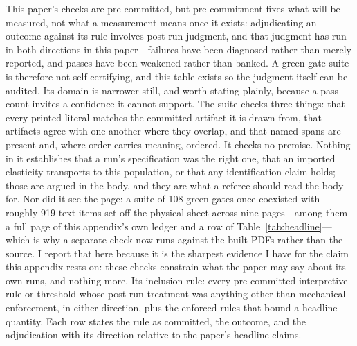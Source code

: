 \documentclass[12pt]{article}
\begin{document}
This paper's checks are pre-committed, but pre-commitment fixes what will be measured, not what a measurement means once it exists: adjudicating an outcome against its rule involves post-run judgment, and that judgment has run in both directions in this paper---failures have been diagnosed rather than merely reported, and passes have been weakened rather than banked. A green gate suite is therefore not self-certifying, and this table exists so the judgment itself can be audited. Its domain is narrower still, and worth stating plainly, because a pass count invites a confidence it cannot support. The suite checks three things: that every printed literal matches the committed artifact it is drawn from, that artifacts agree with one another where they overlap, and that named spans are present and, where order carries meaning, ordered. It checks no premise. Nothing in it establishes that a run's specification was the right one, that an imported elasticity transports to this population, or that any identification claim holds; those are argued in the body, and they are what a referee should read the body for. Nor did it see the page: a suite of 108 green gates once coexisted with roughly 919 text items set off the physical sheet across nine pages---among them a full page of this appendix's own ledger and a row of Table~\ref{tab:headline}---which is why a separate check now runs against the built PDFs rather than the source. I report that here because it is the sharpest evidence I have for the claim this appendix rests on: these checks constrain what the paper may say about its own runs, and nothing more. Its inclusion rule: every pre-committed interpretive rule or threshold whose post-run treatment was anything other than mechanical enforcement, in either direction, plus the enforced rules that bound a headline quantity. Each row states the rule as committed, the outcome, and the adjudication with its direction relative to the paper's headline claims.
\end{document}
